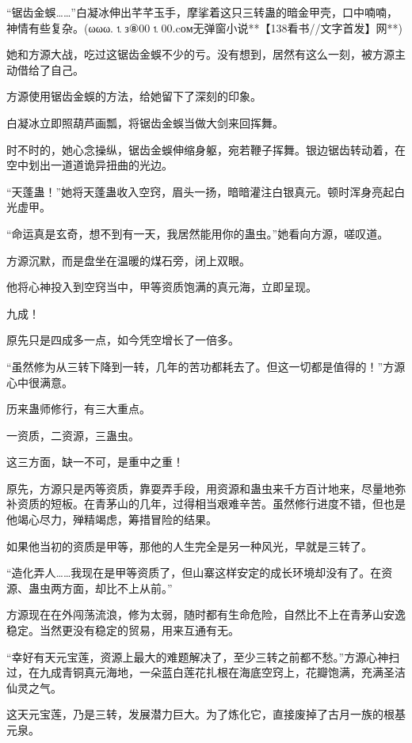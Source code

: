 
\begin{this_body}

“锯齿金蜈……”白凝冰伸出芊芊玉手，摩挲着这只三转蛊的暗金甲壳，口中喃喃，神情有些复杂。(ωωω.⒈з⑧00⒈00.cοм无弹窗小说**【138看书//文字首发】网**)

她和方源大战，吃过这锯齿金蜈不少的亏。没有想到，居然有这么一刻，被方源主动借给了自己。

方源使用锯齿金蜈的方法，给她留下了深刻的印象。

白凝冰立即照葫芦画瓢，将锯齿金蜈当做大剑来回挥舞。

时不时的，她心念操纵，锯齿金蜈伸缩身躯，宛若鞭子挥舞。银边锯齿转动着，在空中划出一道道诡异扭曲的光边。

“天蓬蛊！”她将天蓬蛊收入空窍，眉头一扬，暗暗灌注白银真元。顿时浑身亮起白光虚甲。

“命运真是玄奇，想不到有一天，我居然能用你的蛊虫。”她看向方源，嗟叹道。

方源沉默，而是盘坐在温暖的煤石旁，闭上双眼。

他将心神投入到空窍当中，甲等资质饱满的真元海，立即呈现。

九成！

原先只是四成多一点，如今凭空增长了一倍多。

“虽然修为从三转下降到一转，几年的苦功都耗去了。但这一切都是值得的！”方源心中很满意。

历来蛊师修行，有三大重点。

一资质，二资源，三蛊虫。

这三方面，缺一不可，是重中之重！

原先，方源只是丙等资质，靠耍弄手段，用资源和蛊虫来千方百计地来，尽量地弥补资质的短板。在青茅山的几年，过得相当艰难辛苦。虽然修行进度不错，但也是他竭心尽力，殚精竭虑，筹措冒险的结果。

如果他当初的资质是甲等，那他的人生完全是另一种风光，早就是三转了。

“造化弄人……我现在是甲等资质了，但山寨这样安定的成长环境却没有了。在资源、蛊虫两方面，却比不上从前。”

方源现在在外闯荡流浪，修为太弱，随时都有生命危险，自然比不上在青茅山安逸稳定。当然更没有稳定的贸易，用来互通有无。

“幸好有天元宝莲，资源上最大的难题解决了，至少三转之前都不愁。”方源心神扫过，在九成青铜真元海地，一朵蓝白莲花扎根在海底空窍上，花瓣饱满，充满圣洁仙灵之气。

这天元宝莲，乃是三转，发展潜力巨大。为了炼化它，直接废掉了古月一族的根基元泉。


\end{this_body}
